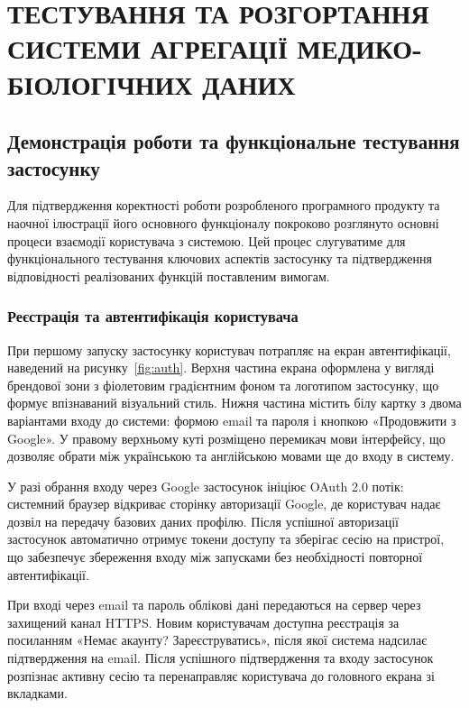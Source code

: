 
\section{ТЕСТУВАННЯ ТА РОЗГОРТАННЯ СИСТЕМИ АГРЕГАЦІЇ МЕДИКО-БІОЛОГІЧНИХ ДАНИХ}

\subsection{Демонстрація роботи та функціональне тестування застосунку}

Для підтвердження коректності роботи розробленого програмного продукту та наочної ілюстрації його основного функціоналу покроково розглянуто основні процеси взаємодії користувача з системою. Цей процес слугуватиме для функціонального тестування ключових аспектів застосунку та підтвердження відповідності реалізованих функцій поставленим вимогам.

\subsubsection{Реєстрація та автентифікація користувача}

При першому запуску застосунку користувач потрапляє на екран автентифікації, наведений на рисунку~\ref{fig:auth}. Верхня частина екрана оформлена у вигляді брендової зони з фіолетовим градієнтним фоном та логотипом застосунку, що формує впізнаваний візуальний стиль. Нижня частина містить білу картку з двома варіантами входу до системи: формою email та пароля і кнопкою «Продовжити з Google». У правому верхньому куті розміщено перемикач мови інтерфейсу, що дозволяє обрати між українською та англійською мовами ще до входу в систему.

У разі обрання входу через Google застосунок ініціює \gls{OAuth} 2.0 потік: системний браузер відкриває сторінку авторизації Google, де користувач надає дозвіл на передачу базових даних профілю. Після успішної авторизації застосунок автоматично отримує токени доступу та зберігає сесію на пристрої, що забезпечує збереження входу між запусками без необхідності повторної автентифікації.

При вході через email та пароль облікові дані передаються на сервер через захищений канал \gls{HTTPS}. Новим користувачам доступна реєстрація за посиланням «Немає акаунту? Зареєструватись», після якої система надсилає підтвердження на email. Після успішного підтвердження та входу застосунок розпізнає активну сесію та перенаправляє користувача до головного екрана зі вкладками.

